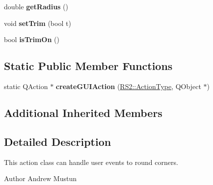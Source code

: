 \begin{DoxyCompactItemize}
\item 
\hypertarget{classRS__ActionModifyRound_a1e00e237a119e3e36e4e257bd41eb548}{double {\bfseries get\-Radius} ()}\label{classRS__ActionModifyRound_a1e00e237a119e3e36e4e257bd41eb548}

\item 
\hypertarget{classRS__ActionModifyRound_a333a3a4d37e039e1cdafdaea1d99ed00}{void {\bfseries set\-Trim} (bool t)}\label{classRS__ActionModifyRound_a333a3a4d37e039e1cdafdaea1d99ed00}

\item 
\hypertarget{classRS__ActionModifyRound_af232beb9b10fd3fc3ba7c428afc44700}{bool {\bfseries is\-Trim\-On} ()}\label{classRS__ActionModifyRound_af232beb9b10fd3fc3ba7c428afc44700}

\end{DoxyCompactItemize}
\subsection*{Static Public Member Functions}
\begin{DoxyCompactItemize}
\item 
\hypertarget{classRS__ActionModifyRound_ac5428848a7019ca036f417a9b6d25d9b}{static Q\-Action $\ast$ {\bfseries create\-G\-U\-I\-Action} (\hyperlink{classRS2_afe3523e0bc41fd637b892321cfc4b9d7}{R\-S2\-::\-Action\-Type}, Q\-Object $\ast$)}\label{classRS__ActionModifyRound_ac5428848a7019ca036f417a9b6d25d9b}

\end{DoxyCompactItemize}
\subsection*{Additional Inherited Members}


\subsection{Detailed Description}
This action class can handle user events to round corners.

\begin{DoxyAuthor}{Author}
Andrew Mustun 
\end{DoxyAuthor}


